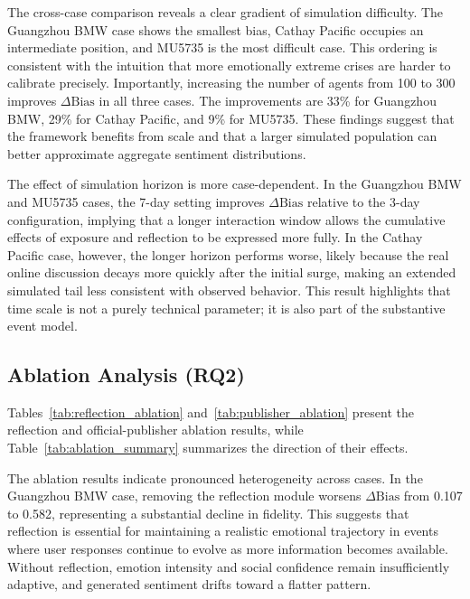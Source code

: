 \documentclass[11pt]{article}
\begin{document}




The cross-case comparison reveals a clear gradient of simulation difficulty. The Guangzhou BMW case shows the smallest bias, Cathay Pacific occupies an intermediate position, and MU5735 is the most difficult case. This ordering is consistent with the intuition that more emotionally extreme crises are harder to calibrate precisely. Importantly, increasing the number of agents from 100 to 300 improves $\Delta\mathrm{Bias}$ in all three cases. The improvements are 33\% for Guangzhou BMW, 29\% for Cathay Pacific, and 9\% for MU5735. These findings suggest that the framework benefits from scale and that a larger simulated population can better approximate aggregate sentiment distributions.

The effect of simulation horizon is more case-dependent. In the Guangzhou BMW and MU5735 cases, the 7-day setting improves $\Delta\mathrm{Bias}$ relative to the 3-day configuration, implying that a longer interaction window allows the cumulative effects of exposure and reflection to be expressed more fully. In the Cathay Pacific case, however, the longer horizon performs worse, likely because the real online discussion decays more quickly after the initial surge, making an extended simulated tail less consistent with observed behavior. This result highlights that time scale is not a purely technical parameter; it is also part of the substantive event model.

\subsection{Ablation Analysis (RQ2)}
Tables~\ref{tab:reflection_ablation} and~\ref{tab:publisher_ablation} present the reflection and official-publisher ablation results, while Table~\ref{tab:ablation_summary} summarizes the direction of their effects.





The ablation results indicate pronounced heterogeneity across cases. In the Guangzhou BMW case, removing the reflection module worsens $\Delta\mathrm{Bias}$ from 0.107 to 0.582, representing a substantial decline in fidelity. This suggests that reflection is essential for maintaining a realistic emotional trajectory in events where user responses continue to evolve as more information becomes available. Without reflection, emotion intensity and social confidence remain insufficiently adaptive, and generated sentiment drifts toward a flatter pattern.
\end{document}
